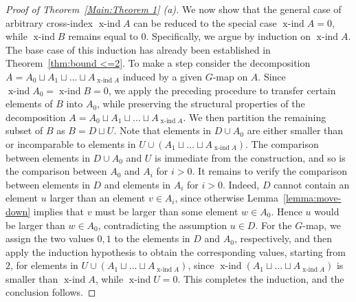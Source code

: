 \documentclass[preprint,12pt]{article}
\theoremstyle{definition}
\theoremstyle{remark}
\numberwithin{equation}{section}
\DeclareMathOperator{\xind}{x-ind}
\begin{document}
\begin{proof}[Proof of Theorem~\ref{Main:Theorem 1} (a)]
We now show that the general case of arbitrary cross-index \(\xind A\) can be reduced to the special case \(\xind A = 0\), while \(\xind B\) remains equal to \(0\). Specifically, we argue by induction on \(\xind A\). The base case of this induction has already been established in Theorem~\ref{thm:bound <=2}. To make a step consider the decomposition \(A = A_0 \sqcup A_1 \sqcup \dots \sqcup A_{\xind A}\) induced by a given \(G\)-map on \(A\). Since \(\xind A_0 = \xind B = 0\), we apply the preceding procedure to transfer certain elements of \(B\) into \(A_0\), while preserving the structural properties of the decomposition \(A = A_0 \sqcup A_1 \sqcup \dots \sqcup A_{\xind A}\). We then partition the remaining subset of \(B\) as \(B = D \sqcup U\). Note that elements in \(D \cup A_0\) are either smaller than or incomparable to elements in \(U \cup (A_1 \sqcup \dots \sqcup A_{\xind A})\). The comparison between elements in \(D \cup A_0\) and \(U\) is immediate from the construction, and so is the comparison between \(A_0\) and \(A_i\) for \(i > 0\). It remains to verify the comparison between elements in \(D\) and elements in \(A_i\) for \(i > 0\). Indeed, \(D\) cannot contain an element \(u\) larger than an element \(v \in A_i\), since otherwise Lemma~\ref{lemma:move-down} implies that \(v\) must be larger than some element \(w \in A_0\). Hence \(u\) would be larger than \(w \in A_0\), contradicting the assumption \(u \in D\). For the \(G\)-map, we assign the two values \(0, 1\) to the elements in \(D\) and \(A_0\), respectively, and then apply the induction hypothesis to obtain the corresponding values, starting from \(2\), for elements in \(U \cup (A_1 \sqcup \dots \sqcup A_{\xind A})\), since \(\xind(A_1 \sqcup \dots \sqcup A_{\xind A})\) is smaller than \(\xind A\), while \(\xind U = 0\). This completes the induction, and the conclusion follows.
\end{proof}
\end{document}
